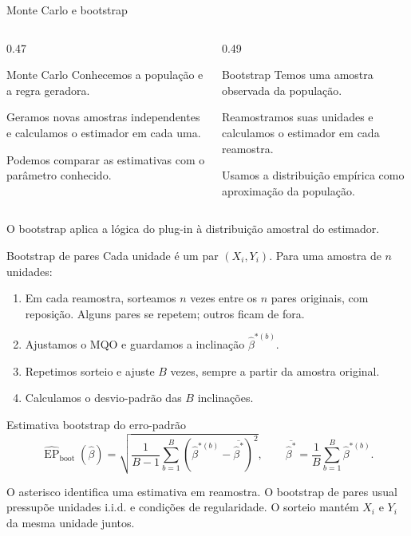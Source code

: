 \documentclass[
  ignorenonframetext,
  brazilian,
  aspectratio=169,
  10pt]{beamer}
\begin{document}
\begin{frame}{Monte Carlo e bootstrap}
\protect{}\label{monte-carlo-e-bootstrap}
\begin{columns}[T,onlytextwidth]
\begin{column}{0.47\textwidth}
\begin{block}{Monte Carlo}
Conhecemos a população e a regra geradora.

\medskip
Geramos novas amostras independentes e calculamos o estimador em cada uma.

\medskip
Podemos comparar as estimativas com o parâmetro conhecido.
\end{block}
\end{column}
\begin{column}{0.49\textwidth}
\begin{block}{Bootstrap}
Temos uma amostra observada da população.

\medskip
Reamostramos suas unidades e calculamos o estimador em cada reamostra.

\medskip
Usamos a distribuição empírica como aproximação da população.
\end{block}
\end{column}
\end{columns}

\bigskip

O bootstrap aplica a lógica do plug-in à distribuição amostral do
estimador.
\end{frame}

\begin{frame}{Bootstrap de pares}
\protect{}\label{bootstrap-de-pares}
Cada unidade é um par \((X_i,Y_i)\). Para uma amostra de \(n\) unidades:

\begin{enumerate}
\item Em cada reamostra, sorteamos $n$ vezes entre os $n$ pares originais,
com reposição. Alguns pares se repetem; outros ficam de fora.
\item Ajustamos o MQO e guardamos a inclinação $\widehat\beta^{*(b)}$.
\item Repetimos sorteio e ajuste $B$ vezes, sempre a partir da amostra original.
\item Calculamos o desvio-padrão das $B$ inclinações.
\end{enumerate}

\begin{block}{Estimativa bootstrap do erro-padrão}
\[
\widehat{\operatorname{EP}}_{\mathrm{boot}}(\widehat\beta)
=\sqrt{\frac{1}{B-1}\sum_{b=1}^{B}
\left(\widehat\beta^{*(b)}-\overline{\widehat\beta^{*}}\right)^2},
\qquad
\overline{\widehat\beta^{*}}=\frac1B\sum_{b=1}^{B}\widehat\beta^{*(b)}.
\]
\end{block}

\small

O asterisco identifica uma estimativa em reamostra. O bootstrap de pares
usual pressupõe unidades i.i.d. e condições de regularidade. O sorteio
mantém \(X_i\) e \(Y_i\) da mesma unidade juntos.
\end{frame}
\end{document}
